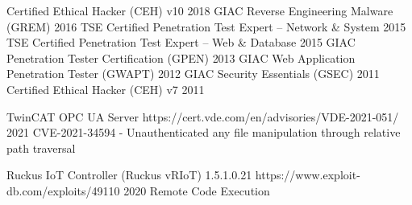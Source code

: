     \itemizeCVEnd



        \titleLinkYearRolePlace
            {Certified Ethical Hacker (CEH) v10}
            {}
            {2018}
            {}
            {}
        \titleLinkYearRolePlace
            {GIAC Reverse Engineering Malware (GREM)}
            {}
            {2016}
            {}
            {}
        \titleLinkYearRolePlace
            {TSE Certified Penetration Test Expert – Network \& System}
            {}
            {2015}
            {}
            {}
        \titleLinkYearRolePlace
            {TSE Certified Penetration Test Expert – Web \& Database}
            {}
            {2015}
            {}
            {}
        \titleLinkYearRolePlace
            {GIAC Penetration Tester Certification (GPEN)}
            {}
            {2013}
            {}
            {}
        \titleLinkYearRolePlace
            {GIAC Web Application Penetration Tester (GWAPT)}
            {}
            {2012}
            {}
            {}
        \titleLinkYearRolePlace
            {GIAC Security Essentials (GSEC)}
            {}
            {2011}
            {}
            {}
        \titleLinkYearRolePlace
            {Certified Ethical Hacker (CEH) v7}
            {}
            {2011}
            {}
            {}
  
    \itemizeCVEnd



        \titleLinkYearRolePlace
            {TwinCAT OPC UA Server}
            {https://cert.vde.com/en/advisories/VDE-2021-051/}
            {2021}
            {CVE-2021-34594 - Unauthenticated any file manipulation through relative path traversal}
            {}

    \itemizeCVEnd



        \titleLinkYearRolePlace
            {Ruckus IoT Controller (Ruckus vRIoT) 1.5.1.0.21}
            {https://www.exploit-db.com/exploits/49110}
            {2020}
            {Remote Code Execution}
            {}
            
    \itemizeCVEnd


